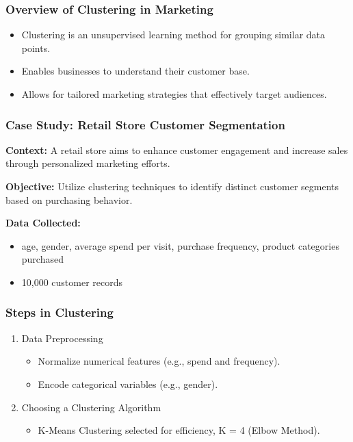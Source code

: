 \documentclass[aspectratio=169]{beamer}
\begin{document}
\begin{frame}[fragile]
    \frametitle{Overview of Clustering in Marketing}
    \begin{itemize}
        \item Clustering is an unsupervised learning method for grouping similar data points.
        \item Enables businesses to understand their customer base.
        \item Allows for tailored marketing strategies that effectively target audiences.
    \end{itemize}
\end{frame}

\begin{frame}[fragile]
    \frametitle{Case Study: Retail Store Customer Segmentation}
    \textbf{Context:} A retail store aims to enhance customer engagement and increase sales through personalized marketing efforts.
    
    \textbf{Objective:} Utilize clustering techniques to identify distinct customer segments based on purchasing behavior.

    \textbf{Data Collected:}
    \begin{itemize}
        \item age, gender, average spend per visit, purchase frequency, product categories purchased
        \item 10,000 customer records
    \end{itemize}

\end{frame}

\begin{frame}[fragile]
    \frametitle{Steps in Clustering}
    \begin{enumerate}
        \item Data Preprocessing
            \begin{itemize}
                \item Normalize numerical features (e.g., spend and frequency).
                \item Encode categorical variables (e.g., gender).
            \end{itemize}
            
        \item Choosing a Clustering Algorithm
            \begin{itemize}
                \item K-Means Clustering selected for efficiency, K = 4 (Elbow Method).
            \end{itemize}
    \end{enumerate}
\end{frame}
\end{document}

